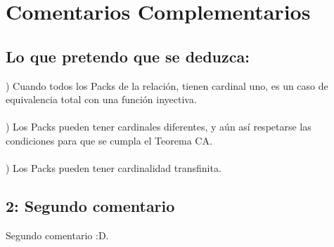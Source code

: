 \chapter[Ordenados por referencias, no por aparición]{Comentarios Complementarios}

\section {Lo que pretendo que se deduzca:}

) Cuando todos los Packs de la relación, tienen cardinal uno, es un caso de equivalencia total con una función inyectiva.\\\\
) Los Packs pueden tener cardinales diferentes, y aún así respetarse las condiciones para que se cumpla el Teorema CA.\\\\
) Los Packs pueden tener cardinalidad transfinita.


\newpage

\section {2: Segundo comentario}

Segundo comentario :D.

\newpage